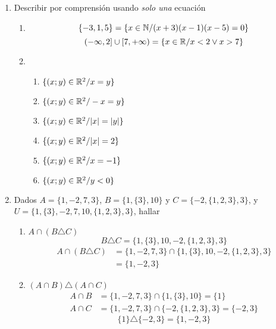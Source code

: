 \documentclass[../practica.root.tex]{subfiles}
\begin{document}
\begin{enumerate}
    \item Describir por comprensión usando \textit{solo una} ecuación
          \begin{enumerate}
              \item
                    \[ \{-3, 1, 5\} = \{x \in \mathbb{N} / (x+3)(x-1)(x-5) = 0\} \]
                    \[ (-\infty, 2]\cup[7, +\infty) = \{x \in \mathbb{R} /  x < 2 \lor x > 7  \}\]
              \item
                    \begin{enumerate}
                        \item $\{(x; y) \in \mathbb{R}^2 / x = y\}$
                        \item $\{(x; y) \in \mathbb{R}^2 / -x = y\}$
                        \item $\{(x; y) \in \mathbb{R}^2 / |x| = |y|\}$
                        \item $\{(x; y) \in \mathbb{R}^2 / |x| = 2\}$
                        \item $\{(x; y) \in \mathbb{R}^2 / x = -1\}$
                        \item $\{(x; y) \in \mathbb{R}^2 / y < 0\}$
                    \end{enumerate}
          \end{enumerate}

    \item Dados $A = \{1, -2, 7, 3\}$, $B = \{1, \{3\}, 10\}$ y $C = \{-2, \{1, 2, 3\}, 3\}$, y
          $U = \{1, \{3\}, -2, 7, 10, \{1,2,3\},3\}$, hallar
          \begin{enumerate}
              \item $A \cap (B \triangle C)$
                    \[ B \triangle C = \{1, \{3\}, 10, -2 , \{1, 2, 3\}, 3\} \]
                    \begin{align*}
                        A \cap (B \triangle C) & = \{1, -2, 7, 3\}\cap\{1, \{3\}, 10, -2 , \{1, 2, 3\}, 3\} \\
                                               & = \boxed{\{1, -2, 3\}}
                    \end{align*}

              \item $(A \cap B)\triangle(A \cap C)$
                    \begin{align*}
                        A \cap B & =  \{1, -2, 7, 3\} \cap \{1, \{3\}, 10\} = \{1\}         \\
                        A \cap C & = \{1, -2, 7, 3\} \cap \{-2, \{1, 2, 3\}, 3\} = \{-2,3\}
                    \end{align*}
                    \[ \{1\} \triangle \{-2,3\} = \boxed{\{1, -2, 3\}}\]


\end{enumerate}
\end{enumerate}
\end{document}
